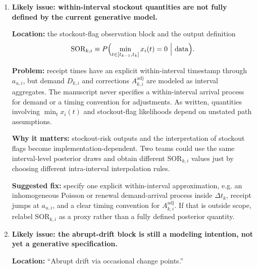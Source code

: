 \documentclass[11pt]{article}
\begin{document}
\begin{enumerate}
  \textbf{Why it matters:} a low on-hand state with a large pipeline can trigger a reorder under the first rule even when the second rule correctly says no new order is needed.
  That inconsistency is especially important because SENA explicitly models the pipeline rather than treating replenishment as instantaneous.

  \textbf{Suggested fix:} either replace the trigger with
  \[
    P\bigl(IP_{k,i}\le \text{ROP}_{k,i}\mid\text{data}\bigr),
  \]
  or state clearly that the on-hand trigger is only a simplified no-open-order heuristic and that the inventory-position rule is the recommended operational output.

  \item \textbf{Likely issue: within-interval stockout quantities are not fully defined by the current generative model.}

  \textbf{Location:} the stockout-flag observation block and the output definition
  \[
    \text{SOR}_{k,i}\equiv P\Bigl(\min_{t\in[t_{k-1},t_k]}x_i(t)=0\ \Big|\ \text{data}\Bigr).
  \]

  \textbf{Problem:} receipt times have an explicit within-interval timestamp through $a_{u,i}$, but demand $D_{k,i}$ and corrections $A^{\mathrm{adj}}_{k,i}$ are modeled as interval aggregates.
  The manuscript never specifies a within-interval arrival process for demand or a timing convention for adjustments.
  As written, quantities involving $\min_t x_i(t)$ and stockout-flag likelihoods depend on unstated path assumptions.

  \textbf{Why it matters:} stockout-risk outputs and the interpretation of stockout flags become implementation-dependent.
  Two teams could use the same interval-level posterior draws and obtain different $\text{SOR}_{k,i}$ values just by choosing different intra-interval interpolation rules.

  \textbf{Suggested fix:} specify one explicit within-interval approximation, e.g.
  an inhomogeneous Poisson or renewal demand-arrival process inside $\Delta t_k$, receipt jumps at $a_{u,i}$, and a clear timing convention for $A^{\mathrm{adj}}_{k,i}$.
  If that is outside scope, relabel $\text{SOR}_{k,i}$ as a proxy rather than a fully defined posterior quantity.

  \item \textbf{Likely issue: the abrupt-drift block is still a modeling intention, not yet a generative specification.}

  \textbf{Location:} ``Abrupt drift via occasional change points.''


\end{enumerate}
\end{document}
